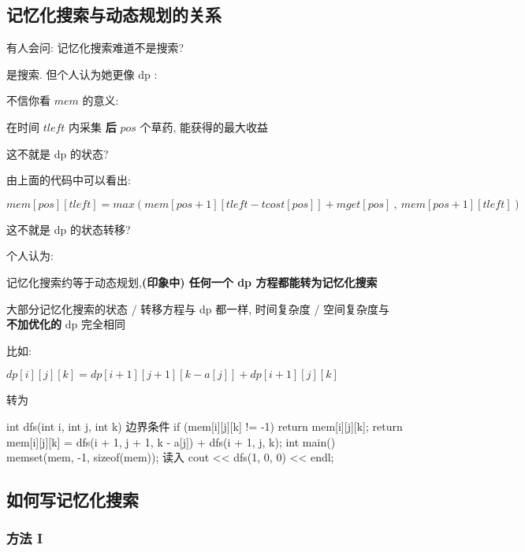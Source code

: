 \hr

\subsection{记忆化搜索与动态规划的关系}

有人会问: 记忆化搜索难道不是搜索?

是搜索. 但个人认为她更像 dp :

不信你看 $mem$ 的意义:

\begin{QUOTE}{}{}
在时间 $tleft$ 内采集 \textbf{ 后 } $pos$ 个草药, 能获得的最大收益
\end{QUOTE}

这不就是 dp 的状态?

由上面的代码中可以看出:

\begin{QUOTE}{}{}
$mem[pos][tleft] = max(mem[pos+1][tleft-tcost[pos]]+mget[pos]\ ,\ mem[pos+1][tleft])$
\end{QUOTE}

这不就是 dp 的状态转移?

个人认为:

\begin{QUOTE}{}{}
记忆化搜索约等于动态规划,\textbf{(印象中) 任何一个 dp 方程都能转为记忆化搜索 }
\end{QUOTE}

大部分记忆化搜索的状态 / 转移方程与 dp 都一样, 时间复杂度 / 空间复杂度与 \textbf{ 不加优化的 } dp 完全相同

比如:

$dp[i][j][k] = dp[i+1][j+1][k-a[j]] + dp[i+1][j][k]$

转为

\begin{cppcode}
int dfs(int i, int j, int k) {
  边界条件
  if (mem[i][j][k] != -1) return mem[i][j][k];
  return mem[i][j][k] = dfs(i + 1, j + 1, k - a[j]) + dfs(i + 1, j, k);
}
int main() {
  memset(mem, -1, sizeof(mem));
  读入
  cout << dfs(1, 0, 0) << endl;
}
\end{cppcode}

\hr

\subsection{如何写记忆化搜索}

\subsubsection{方法 I}

